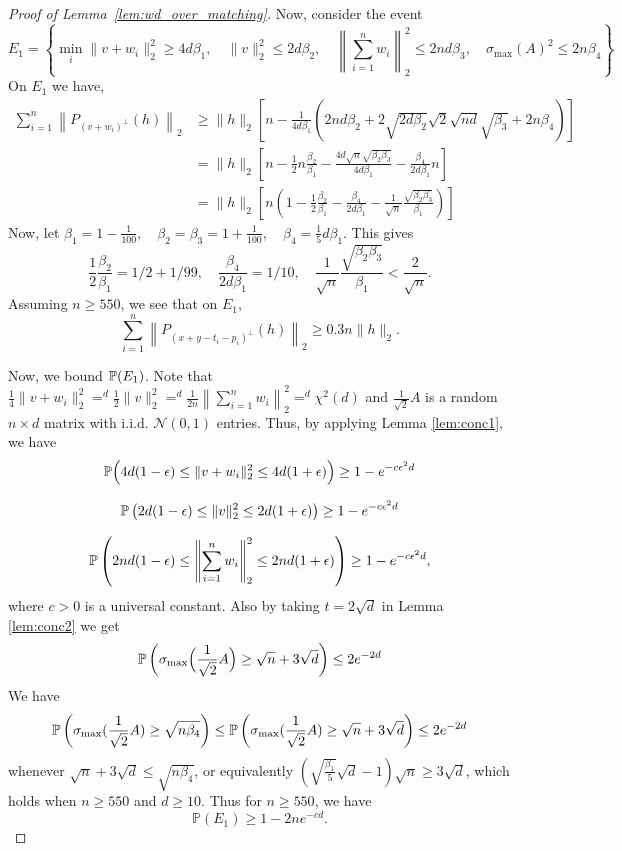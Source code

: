 \begin{proof}[Proof of Lemma~\ref{lem:wd_over_matching}]
Now, consider the event
\[
E_1 = \left\{ \min_{i} \|v+w_i\|_2^2 \geq 4d\beta_1, \quad \|v\|_2^2 \leq 2d\beta_2, \quad \left \| \sum_{i=1}^n w_i \right\|_2^2 \leq 2nd\beta_3, \quad \sigma_{\max}(A)^2 \leq 2n\beta_4  \right\}
\]
On $E_1$ we have,
\begin{align*}
\sum_{i=1}^n \left \| P_{(v+w_i)^\perp}(h)\right \|_2 &\geq \|h\|_2 \left[ n - \frac{1}{4d\beta_1}\left( 2nd\beta_2 + 2\sqrt{2d\beta_2}\sqrt{2}\sqrt{nd}\sqrt{\beta_3} + 2n\beta_4  \right) \right]\\
&= \|h\|_2 \left[n - \frac{1}{2}n \frac{\beta_2}{\beta_1} - \frac{4d\sqrt{n} \sqrt{\beta_2\beta_3}}{4d\beta_1}-\frac{\beta_4 }{2d\beta_1}n \right]\\
& = \|h\|_2 \left[n\left(1 - \frac{1}{2} \frac{\beta_2}{\beta_1} - \frac{\beta_4}{2d\beta_1}- \frac{1}{\sqrt{n}}\frac{ \sqrt{\beta_2\beta_3}}{\beta_1} \right)\right]
\end{align*}
Now, let $\beta_1 = 1-\frac{1}{100}, \quad \beta_2 = \beta_3 = 1 + \frac{1}{100}, \quad \beta_4 = \frac{1}{5}d \beta_1$.  This  gives
\[
\frac{1}{2} \frac{\beta_2}{\beta_1} = 1/2 +1/99, \quad \frac{\beta_4}{2d\beta_1} = 1/10,  \quad \frac{1}{\sqrt{n}}\frac{  \sqrt{\beta_2\beta_3}}{\beta_1} < \frac{2}{\sqrt{n}}.
\]
Assuming $n \geq 550$, we see that on $E_1$,
\[\sum_{i=1}^n \left \| P_{(x+y-t_i - p_i)^\perp}(h)\right \|_2 \geq 0.3 n \|h\|_2. \]


Now, we bound $\P(E_1)$. 
Note that $ \frac{1}{4}\|v+w_i\|_2^2 =^d \frac{1}{2}\|v\|_2^2 =^d \frac{1}{2n} \left \| \sum_{i=1}^n w_i \right\|_2^2 =^d \chi^2(d)$ and $\frac{1}{\sqrt{2}}A$ is a random $n\times d$ matrix with i.i.d. $\mathcal{N}(0,1)$ entries. Thus, by applying Lemma \ref{lem:conc1}, we have 
\[
\P \Bigl( 4d(1-\epsilon) \leq \|v+w_i\|_2^2 \leq 4d(1+\epsilon) \Bigr) \geq 1 - e^{-c \epsilon^2 d}
\]

\[
\P\left( 2d(1-\epsilon) \leq \|v\|_2^2 \leq 2d(1+\epsilon) \right) \geq 1 - e^{-c \epsilon^2 d}
\]

\[
\P\left( 2nd(1-\epsilon) \leq \left \| \sum_{i=1}^n w_i \right\|_2^2 \leq 2nd(1+\epsilon) \right) \geq 1 - e^{-c \epsilon^2 d},
\]
where $c>0$ is a universal constant. Also by taking $t =2  \sqrt{d}$ in Lemma \ref{lem:conc2} we get
\[
\P \left( \sigma_{\text{max}}\Bigl(\frac{1}{\sqrt{2}} A\Bigr) \geq \sqrt{n} +3\sqrt{d} \right) \leq 2e^{-2d}
\]
We have
\[
\P  \left(\sigma_{\max} (\frac{1}{\sqrt{2}} A) \geq \sqrt{n \beta_4}\right) \leq \P\left( \sigma_{\max} (\frac{1}{\sqrt{2}} A) \geq \sqrt{n} + 3\sqrt{d} \right) \leq 2e^{-2d}
\]
whenever $\sqrt{n} + 3\sqrt{d} \leq \sqrt{n \beta_4}$, or equivalently $(\sqrt{\frac{\beta_1}{5}}\sqrt{d} -1) \sqrt{n} \geq 3 \sqrt{d}$,  %
which holds when $n \geq 550$ and $d \geq 10$. Thus for $n\geq 550$, we have
\[
\mathbb{P}(E_1) \geq 1- 2n e^{-cd} .
\]


\end{proof}
